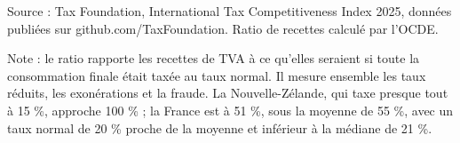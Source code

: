 Source : Tax Foundation, International Tax Competitiveness Index 2025, données publiées sur github.com/TaxFoundation. Ratio de recettes calculé par l'OCDE.\par Note : le ratio rapporte les recettes de TVA à ce qu'elles seraient si toute la consommation finale était taxée au taux normal. Il mesure ensemble les taux réduits, les exonérations et la fraude. La Nouvelle-Zélande, qui taxe presque tout à 15 \%, approche 100 \% ; la France est à 51 \%, sous la moyenne de 55 \%, avec un taux normal de 20 \% proche de la moyenne et inférieur à la médiane de 21 \%.
